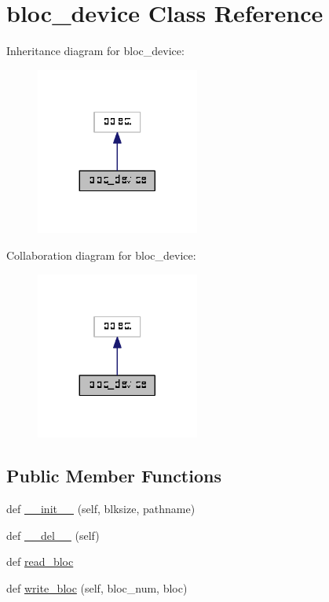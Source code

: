 \hypertarget{classbloc__device_1_1bloc__device}{}\section{bloc\+\_\+device Class Reference}
\label{classbloc__device_1_1bloc__device}


Inheritance diagram for bloc\+\_\+device\+:
\nopagebreak
\begin{figure}[H]
\begin{center}
\leavevmode
\includegraphics[width=152pt]{classbloc__device_1_1bloc__device__inherit__graph}
\end{center}
\end{figure}


Collaboration diagram for bloc\+\_\+device\+:
\nopagebreak
\begin{figure}[H]
\begin{center}
\leavevmode
\includegraphics[width=152pt]{classbloc__device_1_1bloc__device__coll__graph}
\end{center}
\end{figure}
\subsection*{Public Member Functions}
\begin{DoxyCompactItemize}
\item 
def \hyperlink{classbloc__device_1_1bloc__device_ac6e95c27b9ae6c994fd74a9314a4fed4}{\+\_\+\+\_\+init\+\_\+\+\_\+} (self, blksize, pathname)
\item 
def \hyperlink{classbloc__device_1_1bloc__device_a41a65d7030dd1006b177d0bc24e1a12b}{\+\_\+\+\_\+del\+\_\+\+\_\+} (self)
\item 
def \hyperlink{classbloc__device_1_1bloc__device_ae8140b2e367967eee2d1e692e1fa09ee}{read\+\_\+bloc}
\item 
def \hyperlink{classbloc__device_1_1bloc__device_a1ebddb0555944a72d7d252d13364b943}{write\+\_\+bloc} (self, bloc\+\_\+num, bloc)
\end{DoxyCompactItemize}
